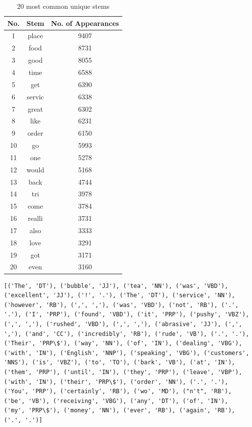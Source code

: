 \begin{table}[!h]
	\tiny
	\centering
	\caption{20 most common unique stems}
	\begin{tabular}{c|c|c}
		No. & Stem & No. of Appearances  \\
		\hline
		1 & place & 9407 \\
		2 & food & 8731 \\
		3 & good & 8055 \\
		4 & time & 6588 \\
		5 & get & 6390 \\
		6 & servic & 6338 \\
		7 & great & 6302 \\
		8 & like & 6231 \\
		9 & order & 6150 \\
		10 & go & 5993 \\
		11 & one & 5278 \\
		12 & would & 5168 \\
		13 & back & 4744 \\
		14 & tri & 3978 \\
		15 & come & 3784 \\
		16 & realli & 3731 \\
		17 & also & 3333 \\
		18 & love & 3291 \\
		19 & got & 3171 \\
		20 & even & 3160\\
	\end{tabular}
\end{table}
\newpage
\begin{Verbatim}[breaklines=true, breakanywhere=true]
[('The', 'DT'), ('bubble', 'JJ'), ('tea', 'NN'), ('was', 'VBD'), ('excellent', 'JJ'), ('!', '.'), ('The', 'DT'), ('service', 'NN'), ('however', 'RB'), (',', ','), ('was', 'VBD'), ('not', 'RB'), ('.', '.'), ('I', 'PRP'), ('found', 'VBD'), ('it', 'PRP'), ('pushy', 'VBZ'), (',', ','), ('rushed', 'VBD'), (',', ','), ('abrasive', 'JJ'), (',', ','), ('and', 'CC'), ('incredibly', 'RB'), ('rude', 'VB'), ('.', '.'), ('Their', 'PRP\$'), ('way', 'NN'), ('of', 'IN'), ('dealing', 'VBG'), ('with', 'IN'), ('English', 'NNP'), ('speaking', 'VBG'), ('customers', 'NNS'), ('is', 'VBZ'), ('to', 'TO'), ('bark', 'VB'), ('at', 'IN'), ('them', 'PRP'), ('until', 'IN'), ('they', 'PRP'), ('leave', 'VBP'), ('with', 'IN'), ('their', 'PRP\$'), ('order', 'NN'), ('.', '.'), ('You', 'PRP'), ('certainly', 'RB'), ('wo', 'MD'), ("n't", 'RB'), ('be', 'VB'), ('receiving', 'VBG'), ('any', 'DT'), ('of', 'IN'), ('my', 'PRP\$'), ('money', 'NN'), ('ever', 'RB'), ('again', 'RB'), ('.', '.')]
\end{Verbatim}

